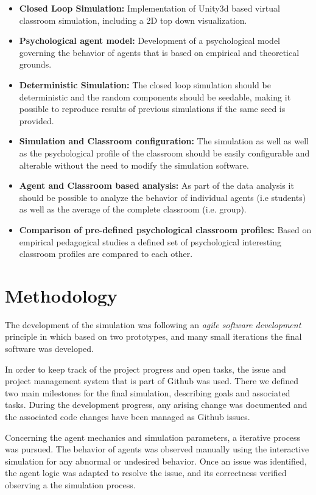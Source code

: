 \begin{itemize}
    \item \textbf{Closed Loop Simulation:} Implementation of Unity3d based virtual
    classroom simulation, including a 2D top down visualization.
    \item \textbf{Psychological agent model:} Development of a psychological model
    governing the behavior of agents that is based on empirical and theoretical grounds.
    \item \textbf{Deterministic Simulation:} The closed loop simulation should be
    deterministic and the random components should be seedable, making it possible
    to reproduce results of previous simulations if the same seed is provided.
    \item \textbf{Simulation and Classroom configuration:} The simulation as well
    as well as the psychological profile of the classroom should be easily configurable
    and alterable without the need to modify the simulation software.
    \item \textbf{Agent and Classroom based analysis:} As part of the data analysis
    it should be possible to analyze the behavior of individual agents (i.e students)
    as well as the average of the complete classroom (i.e. group).
    \item \textbf{Comparison of pre-defined psychological classroom profiles:} Based
    on empirical pedagogical studies a defined set of psychological interesting classroom
    profiles are compared to each other.
\end{itemize}

\section{Methodology}
The development of the simulation was following an \textit{agile software development}
principle in which based on two prototypes, and many small iterations the final
software was developed.

\bb

In order to keep track of the project progress and open tasks, the issue and project
management system that is part of Github was used. There we defined two main milestones
for the final simulation, describing goals and associated tasks.
During the development progress, any arising change was documented and the associated
code changes have been managed as Github issues.

\bb

Concerning the agent mechanics and simulation parameters, a iterative process was
pursued. The behavior of agents was observed manually using the interactive simulation
for any abnormal or undesired behavior. Once an issue was identified, the agent logic
was adapted to resolve the issue, and its correctness verified observing a the
simulation process.

